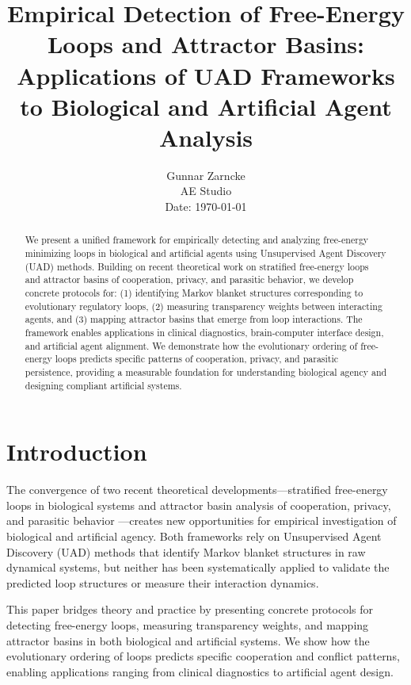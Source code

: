 \documentclass[10pt,conference]{IEEEtran}
\title{Empirical Detection of Free-Energy Loops and Attractor Basins:\\
Applications of UAD Frameworks to Biological and Artificial Agent Analysis}
\author{Gunnar Zarncke\\
AE Studio\\
\small{Date: \today}}
\begin{document}
\maketitle

\begin{abstract}
We present a unified framework for empirically detecting and analyzing free-energy minimizing loops in biological and artificial agents using Unsupervised Agent Discovery (UAD) methods. Building on recent theoretical work on stratified free-energy loops and attractor basins of cooperation, privacy, and parasitic behavior, we develop concrete protocols for: (1) identifying Markov blanket structures corresponding to evolutionary regulatory loops, (2) measuring transparency weights between interacting agents, and (3) mapping attractor basins that emerge from loop interactions. The framework enables applications in clinical diagnostics, brain-computer interface design, and artificial agent alignment. We demonstrate how the evolutionary ordering of free-energy loops predicts specific patterns of cooperation, privacy, and parasitic persistence, providing a measurable foundation for understanding biological agency and designing compliant artificial systems.
\end{abstract}

\section{Introduction}

The convergence of two recent theoretical developments—stratified free-energy loops in biological systems \cite{zarncke2025loops} and attractor basin analysis of cooperation, privacy, and parasitic behavior \cite{zarncke2025attractors}—creates new opportunities for empirical investigation of biological and artificial agency. Both frameworks rely on Unsupervised Agent Discovery (UAD) methods that identify Markov blanket structures in raw dynamical systems, but neither has been systematically applied to validate the predicted loop structures or measure their interaction dynamics.

This paper bridges theory and practice by presenting concrete protocols for detecting free-energy loops, measuring transparency weights, and mapping attractor basins in both biological and artificial systems. We show how the evolutionary ordering of loops predicts specific cooperation and conflict patterns, enabling applications ranging from clinical diagnostics to artificial agent design.
\end{document}
